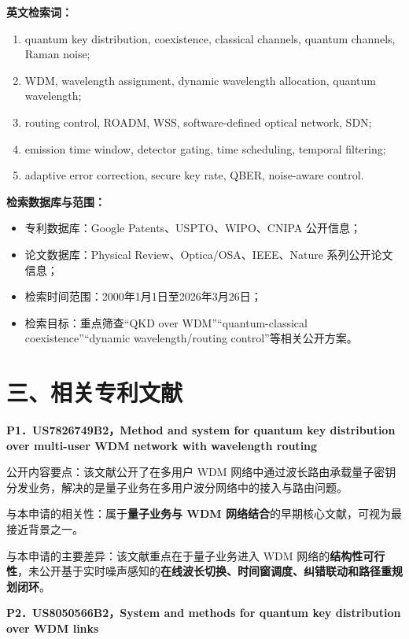 \documentclass[12pt,a4paper]{article}
\begin{document}
\textbf{英文检索词：}
\begin{enumerate}[label=(\arabic*)]
    \item quantum key distribution, coexistence, classical channels, quantum channels, Raman noise;
    \item WDM, wavelength assignment, dynamic wavelength allocation, quantum wavelength;
    \item routing control, ROADM, WSS, software-defined optical network, SDN;
    \item emission time window, detector gating, time scheduling, temporal filtering;
    \item adaptive error correction, secure key rate, QBER, noise-aware control.
\end{enumerate}

\textbf{检索数据库与范围：}
\begin{itemize}[leftmargin=2em]
    \item 专利数据库：Google Patents、USPTO、WIPO、CNIPA 公开信息；
    \item 论文数据库：Physical Review、Optica/OSA、IEEE、Nature 系列公开论文信息；
    \item 检索时间范围：2000年1月1日至2026年3月26日；
    \item 检索目标：重点筛查“QKD over WDM”“quantum-classical coexistence”“dynamic wavelength/routing control”等相关公开方案。
\end{itemize}

\section*{三、相关专利文献}

\textbf{P1．US7826749B2，Method and system for quantum key distribution over multi-user WDM network with wavelength routing}

公开内容要点：该文献公开了在多用户 WDM 网络中通过波长路由承载量子密钥分发业务，解决的是量子业务在多用户波分网络中的接入与路由问题。

与本申请的相关性：属于\textbf{量子业务与 WDM 网络结合}的早期核心文献，可视为最接近背景之一。

与本申请的主要差异：该文献重点在于量子业务进入 WDM 网络的\textbf{结构性可行性}，未公开基于实时噪声感知的\textbf{在线波长切换、时间窗调度、纠错联动和路径重规划闭环}。

\vspace{0.5em}
\textbf{P2．US8050566B2，System and methods for quantum key distribution over WDM links}
\end{document}
